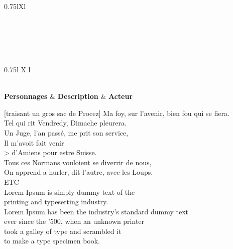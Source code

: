 \documentclass[12pt]{article}
\begin{document}
\begin{xltabular}[c]{0.75\linewidth}{lXl}
  \caption*{\textbf{Conspectus Siglorum}\label{tab:conspectus-siglorum}}\\
  \\
  \\
  \\
\end{xltabular}

\newpage

\begin{xltabular}{0.75\linewidth}{l X l}
  \caption*{\textbf{Cast List}\label{tab:cast-list}}\\
  \hline
  \textbf{Personnages} & \textbf{Description} & \textbf{Acteur} \\
  \hline
  \CastTableBody
  \hline
\end{xltabular}


\begin{ekddrama}
\begin{speech}
[traisant un gros sac de Procez]
Ma foy, sur l'avenir, bien fou qui se fiera.\\
Tel qui rit Vendredy, Dimache pleurera.\\
Un Juge, l'an passé, me prit  son service,\\
Il m'avoit fait venir\\>
\phantom{Il m'avoit fait}d'Amiens pour estre Suisse.\\
Tous ces Normans vouloient se diverrir de nous,\\
On apprend a hurler, dit l'autre, avec les Loups.\\
ETC\\
Lorem Ipsum is simply dummy text of the \\
printing and typesetting industry.\\
Lorem Ipsum has been the industry's standard dummy text\\
ever since the '500, when an unknown printer\\
took a galley of type and scrambled it\\
to make a type specimen book.\\
\end{speech}


\end{ekddrama}
\end{document}
